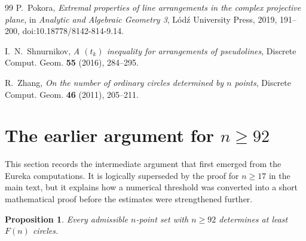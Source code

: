 \documentclass[11pt,a4paper]{article}
\newtheorem{proposition}[theorem]{Proposition}
\theoremstyle{definition}
\begin{document}
\begin{thebibliography}{99}
P.~Pokora,
\emph{Extremal properties of line arrangements in the complex projective plane},
in \emph{Analytic and Algebraic Geometry 3}, L\'od\'z University Press, 2019,
191--200, doi:10.18778/8142-814-9.14.

I.~N.~Shnurnikov,
\emph{A $(t_k)$ inequality for arrangements of pseudolines},
Discrete Comput. Geom. \textbf{55} (2016), 284--295.

R.~Zhang,
\emph{On the number of ordinary circles determined by $n$ points},
Discrete Comput. Geom. \textbf{46} (2011), 205--211.
\end{thebibliography}

\section{The earlier argument for \texorpdfstring{$n\ge92$}{n>=92}}
\label{app:early92-en}

This section records the intermediate argument that first emerged from the
Eureka computations.  It is logically superseded by the proof for $n\ge17$ in
the main text, but it explains how a numerical threshold was converted into a
short mathematical proof before the estimates were strengthened further.

\begin{proposition}
Every admissible $n$-point set with $n\ge92$ determines at least $F(n)$
circles.
\end{proposition}
\end{document}
